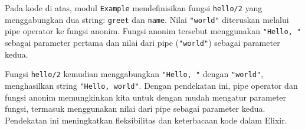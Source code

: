 Pada kode di atas, modul \texttt{Example} mendefinisikan fungsi \texttt{hello/2} yang menggabungkan dua string: \texttt{greet} dan \texttt{name}. Nilai \texttt{"world"} diteruskan melalui pipe operator ke fungsi anonim. Fungsi anonim tersebut menggunakan \texttt{"Hello, "} sebagai parameter pertama dan nilai dari pipe (\texttt{"world"}) sebagai parameter kedua. 

Fungsi \texttt{hello/2} kemudian menggabungkan \texttt{"Hello, "} dengan \texttt{"world"}, menghasilkan string \texttt{"Hello, world"}. Dengan pendekatan ini, pipe operator dan fungsi anonim memungkinkan kita untuk dengan mudah mengatur parameter fungsi, termasuk menggunakan nilai dari pipe sebagai parameter kedua. Pendekatan ini meningkatkan fleksibilitas dan keterbacaan kode dalam Elixir.

